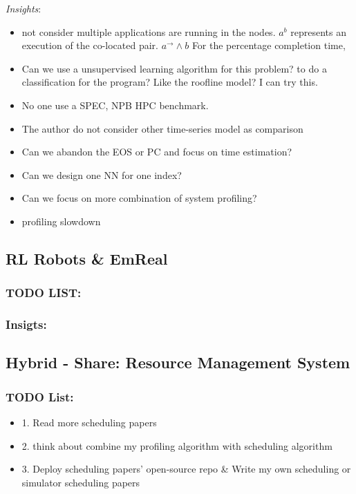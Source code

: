 \documentclass[UTF8]{article}
\begin{document}
    \emph{Insights}: 
    \begin{itemize}
        \item not consider multiple applications are running in the nodes. $a^b$ represents an execution of the co-located pair. $a^{\rightarrow} \wedge b$ For the percentage completion time, 
    
        \item Can we use a unsupervised learning algorithm for this problem?  to do a classification for the program?  Like the roofline model? I can try this.
    
        \item No one use a SPEC, NPB HPC benchmark.
    
        \item The author do not consider other time-series model as comparison
    
        \item Can we abandon the EOS or PC and focus on time estimation?
    
        \item Can we design one NN for one index?
    
        \item Can we focus on more combination of system profiling?
    
        \item profiling slowdown
    \end{itemize}
    
\subsection{RL Robots \& EmReal}
    \subsubsection{TODO LIST:}
    \subsubsection{Insigts:}

\subsection{Hybrid - Share: Resource Management System}
    \subsubsection{TODO List:}
    \begin{itemize}
        \item 1. Read more scheduling papers
        \item 2. think about combine my profiling algorithm with scheduling algorithm
        \item 3. Deploy scheduling papers' open-source repo \& Write my own scheduling or simulator scheduling papers
    \end{itemize}
\end{document}
